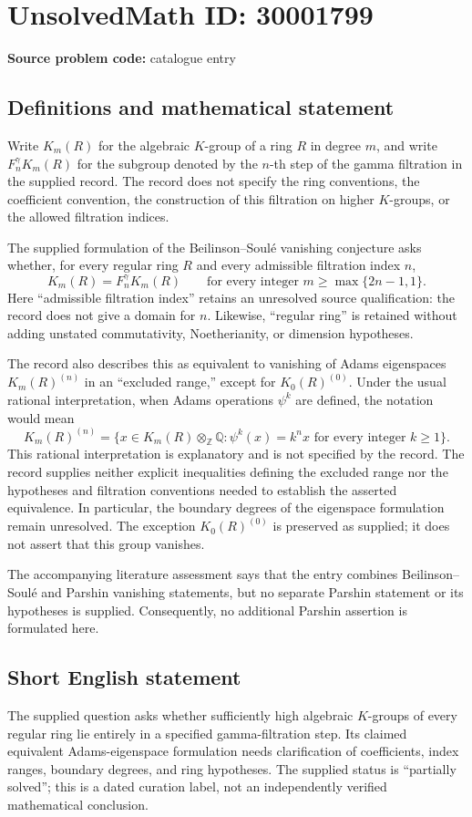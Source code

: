 \documentclass[11pt]{article}
\newcommand{\Z}{\mathbb{Z}}
\newcommand{\Q}{\mathbb{Q}}
\begin{document}
\section*{UnsolvedMath ID: 30001799}
\textbf{Source problem code:} catalogue entry
\subsection{Definitions and mathematical statement}
Write \(K_m(R)\) for the algebraic \(K\)-group of a ring \(R\) in degree \(m\), and write \(F_n^\gamma K_m(R)\) for the subgroup denoted by the \(n\)-th step of the gamma filtration in the supplied record. The record does not specify the ring conventions, the coefficient convention, the construction of this filtration on higher \(K\)-groups, or the allowed filtration indices.

The supplied formulation of the Beilinson--Soul\'e vanishing conjecture asks whether, for every regular ring \(R\) and every admissible filtration index \(n\),
\[
K_m(R)=F_n^\gamma K_m(R)
\qquad\text{for every integer }m\geq\max\{2n-1,1\}.
\]
Here ``admissible filtration index'' retains an unresolved source qualification: the record does not give a domain for \(n\). Likewise, ``regular ring'' is retained without adding unstated commutativity, Noetherianity, or dimension hypotheses.

The record also describes this as equivalent to vanishing of Adams eigenspaces \(K_m(R)^{(n)}\) in an ``excluded range,'' except for \(K_0(R)^{(0)}\). Under the usual rational interpretation, when Adams operations \(\psi^k\) are defined, the notation would mean
\[
K_m(R)^{(n)}
=
\bigl\{x\in K_m(R)\otimes_{\Z}\Q:
\psi^k(x)=k^n x\text{ for every integer }k\geq1\bigr\}.
\]
This rational interpretation is explanatory and is not specified by the record. The record supplies neither explicit inequalities defining the excluded range nor the hypotheses and filtration conventions needed to establish the asserted equivalence. In particular, the boundary degrees of the eigenspace formulation remain unresolved. The exception \(K_0(R)^{(0)}\) is preserved as supplied; it does not assert that this group vanishes.

The accompanying literature assessment says that the entry combines Beilinson--Soul\'e and Parshin vanishing statements, but no separate Parshin statement or its hypotheses is supplied. Consequently, no additional Parshin assertion is formulated here.
\subsection{Short English statement}
The supplied question asks whether sufficiently high algebraic \(K\)-groups of every regular ring lie entirely in a specified gamma-filtration step. Its claimed equivalent Adams-eigenspace formulation needs clarification of coefficients, index ranges, boundary degrees, and ring hypotheses. The supplied status is ``partially solved''; this is a dated curation label, not an independently verified mathematical conclusion.
\end{document}

